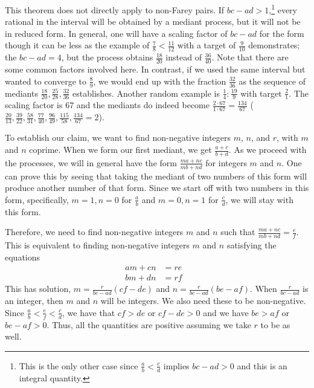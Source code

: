 \documentclass[12pt]{article}
\theoremstyle{remark}
\begin{document}
This theorem does not directly apply to non-Farey pairs. If $bc-ad > 1$,\footnote{This is the only other case since $\frac{a}{b} < \frac{c}{d}$ implies $bc - ad > 0$ and this is an integral quantity.} every rational in the interval will be obtained by a mediant process, but it will not be in reduced form. In general, one will have a scaling factor of $bc-ad$ for the form though it can be less as the example of $\frac{7}{8}< \frac{11}{12}$ with a target of $\frac{9}{10}$ demonstrates; the $bc-ad = 4$, but the process obtains $\frac{18}{20}$ instead of $\frac{36}{40}$. Note that there are some common factors involved here. In contrast, if we used the same interval but wanted to converge to $\frac{8}{9}$, we would end up with the fraction $\frac{32}{36}$ as the sequence of mediants $\frac{18}{20}, \frac{25}{28}, \frac{32}{36}$ establishes. Another random example is  $\frac{1}{4} : \frac{19}{9}$ with target $\frac{2}{1}$. The scaling factor is $67$ and the mediants do indeed become $\frac{2 \cdot 67}{1 \cdot 67} = \frac{134}{67}$  ($\frac{20}{13}, \frac{39}{22}, \frac{58}{31}, \frac{77}{40}, \frac{96}{49}, \frac{115}{58}, \frac{134}{67} = 2$). 


To establish our claim, we want to find non-negative integers $m$, $n$, and $r$, with $m$ and $n$ coprime. When we form our first mediant, we get $\frac{a+c}{b+d}$. As we proceed with the processes, we will in general have the form $\frac{ma + nc}{mb + nd}$ for integers $m$ and $n$. One can prove this by seeing that taking the mediant of two numbers of this form will produce another number of that form. Since we start off with two numbers in this form, specifically, $m=1, n=0$ for $\frac{a}{b}$ and $m=0, n=1$ for $\frac{c}{d}$, we will stay with this form. 

Therefore, we need to find non-negative integers $m$ and $n$ such that $\frac{ma+nc}{mb+nd} = \frac{e}{f}$. This is equivalent to finding non-negative integers $m$ and $n$
satisfying the equations
\begin{align*}
    am + cn &= re & \\
    bm + dn &= rf & 
\end{align*}
This has solution, $m = \frac{r}{bc-ad} (cf-de)$ and $n= \frac{r}{bc-ad} (be-af)$. When $\frac{r}{bc-ad}$ is an integer, then $m$ and $n$ will be integers. We also need these to be non-negative. Since $\frac{a}{b} < \frac{e}{f} < \frac{c}{d}$, we have that $cf>de$ or $cf - de > 0$ and we have $be>af$ or $be - af > 0$. Thus, all the quantities are positive assuming we take $r$ to be as well. 
\end{document}
